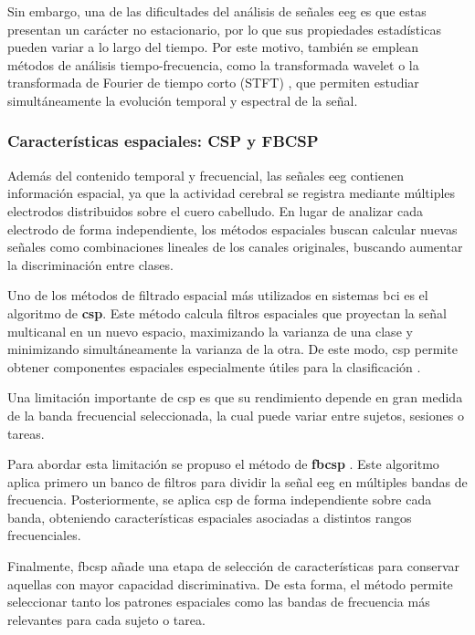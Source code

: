 Sin embargo, una de las dificultades del análisis de señales \acrshort{eeg} es que estas presentan un carácter no estacionario, por lo que sus propiedades estadísticas pueden variar a lo largo del tiempo. Por este motivo, también se emplean métodos de análisis tiempo-frecuencia, como la transformada wavelet o la transformada de Fourier de tiempo corto (STFT) \cite{stancin_ReviewEEG2021,siuly_EEGSignal2016}, que permiten estudiar simultáneamente la evolución temporal y espectral de la señal.

\subsubsection{Características espaciales: CSP y FBCSP}

Además del contenido temporal y frecuencial, las señales \acrshort{eeg} contienen información espacial, ya que la actividad cerebral se registra mediante múltiples electrodos distribuidos sobre el cuero cabelludo. En lugar de analizar cada electrodo de forma independiente, los métodos espaciales buscan calcular nuevas señales como combinaciones lineales de los canales originales, buscando aumentar la discriminación entre clases.

Uno de los métodos de filtrado espacial más utilizados en sistemas \acrshort{bci} es el algoritmo de \textbf{\acrfull{csp}}. Este método calcula filtros espaciales que proyectan la señal multicanal en un nuevo espacio, maximizando la varianza de una clase y minimizando simultáneamente la varianza de la otra. De este modo, \acrshort{csp} permite obtener componentes espaciales especialmente útiles para la clasificación \cite{ramoser_OptimalSpatial2000,blankertz_OptimizingSpatial2008}.

Una limitación importante de \acrshort{csp} es que su rendimiento depende en gran medida de la banda frecuencial seleccionada, la cual puede variar entre sujetos, sesiones o tareas.

Para abordar esta limitación se propuso el método de \textbf{\acrfull{fbcsp}} \cite{ang_FilterBank2008,ang_FilterBank2012}. Este algoritmo aplica primero un banco de filtros para dividir la señal \acrshort{eeg} en múltiples bandas de frecuencia. Posteriormente, se aplica \acrshort{csp} de forma independiente sobre cada banda, obteniendo características espaciales asociadas a distintos rangos frecuenciales.

Finalmente, \acrshort{fbcsp} añade una etapa de selección de características para conservar aquellas con mayor capacidad discriminativa. De esta forma, el método permite seleccionar tanto los patrones espaciales como las bandas de frecuencia más relevantes para cada sujeto o tarea.

